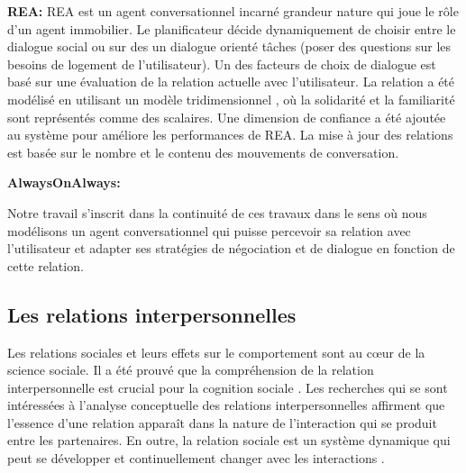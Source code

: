 \documentclass [french]{sig-alternate-05-2015}
\begin{document}
\par \textbf{REA: } REA \cite{bickmore2005establishing} est un agent conversationnel incarné grandeur nature qui joue le rôle d'un agent immobilier. Le planificateur décide dynamiquement  de choisir entre le dialogue social  ou sur des un dialogue orienté tâches (poser des questions sur les besoins de logement de l'utilisateur). Un des facteurs de choix de dialogue est basé sur une évaluation de la relation actuelle avec l'utilisateur. La relation a été modélisé en utilisant un modèle tridimensionnel \cite{svennevig2000getting}, où la solidarité et la familiarité sont représentés comme des scalaires. Une dimension de confiance a été ajoutée au système pour améliore les performances de REA. La  mise à jour des  relations est basée sur le nombre et le contenu des mouvements de conversation.

\par \textbf{AlwaysOnAlways:}
\par Notre travail s'inscrit dans la continuité de ces travaux dans le sens où nous modélisons un agent conversationnel qui puisse percevoir sa relation avec l'utilisateur et adapter ses stratégies de négociation et de dialogue en fonction de cette relation. 

\subsection{Les relations interpersonnelles}
\par Les relations sociales et leurs effets sur le comportement sont au cœur de la science sociale. Il a été prouvé que la compréhension de la relation interpersonnelle est crucial pour la cognition sociale \cite{reis2000relationship}. Les recherches qui se sont intéressées à l'analyse conceptuelle des relations interpersonnelles affirment que l'essence d'une relation apparaît dans la nature de l'interaction qui se produit entre les partenaires. En outre, la relation sociale est un système dynamique qui peut se développer et continuellement changer avec les interactions \cite {reis2000relationship,svennevig2000getting}.
\end{document}
